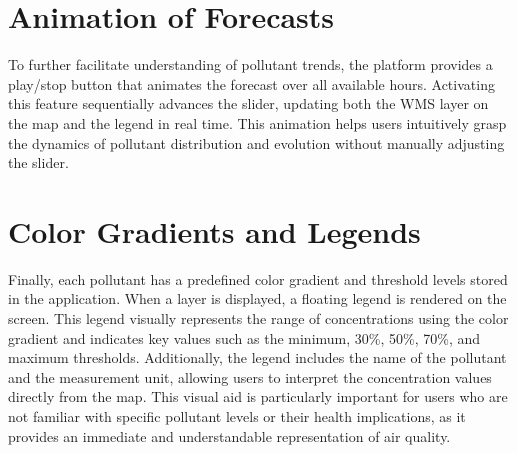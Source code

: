 \section{Animation of Forecasts}

To further facilitate understanding of pollutant trends, the platform provides a play/stop button that animates the forecast over all available hours. Activating this feature sequentially advances the slider, updating both the WMS layer on the map and the legend in real time. This animation helps users intuitively grasp the dynamics of pollutant distribution and evolution without manually adjusting the slider.

\section{Color Gradients and Legends}

Finally, each pollutant has a predefined color gradient and threshold levels stored in the application. When a layer is displayed, a floating legend is rendered on the screen. This legend visually represents the range of concentrations using the color gradient and indicates key values such as the minimum, 30\%, 50\%, 70\%, and maximum thresholds. Additionally, the legend includes the name of the pollutant and the measurement unit, allowing users to interpret the concentration values directly from the map. This visual aid is particularly important for users who are not familiar with specific pollutant levels or their health implications, as it provides an immediate and understandable representation of air quality.
